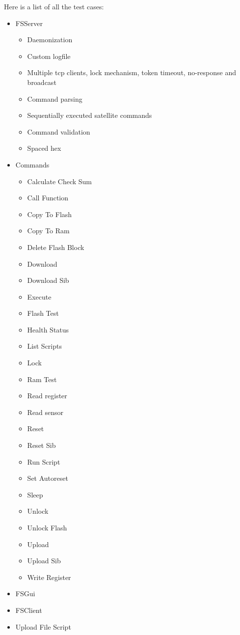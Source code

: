 Here is a list of all the test cases:
\begin{itemize}
	\item FSServer

	\begin{itemize}
		\item Daemonization
		\item Custom logfile
		\item Multiple tcp clients, lock mechanism, token timeout, no-response and broadcast
		\item Command parsing
		\item Sequentially executed satellite commands
		\item Command validation
		\item Spaced hex
	\end{itemize}

	\item Commands
		\begin{itemize}
			\item Calculate Check Sum
			\item Call Function
			\item Copy To Flash
			\item Copy To Ram
			\item Delete Flash Block
			\item Download
			\item Download Sib
			\item Execute
			\item Flash Test
			\item Health Status
			\item List Scripts
			\item Lock
			\item Ram Test
			\item Read register
			\item Read sensor
			\item Reset
			\item Reset Sib
			\item Run Script
			\item Set Autoreset
			\item Sleep
			\item Unlock
			\item Unlock Flash
			\item Upload
			\item Upload Sib
			\item Write Register
		\end{itemize}

	\item FSGui
	\item FSClient
	\item Upload File Script

\end{itemize}

